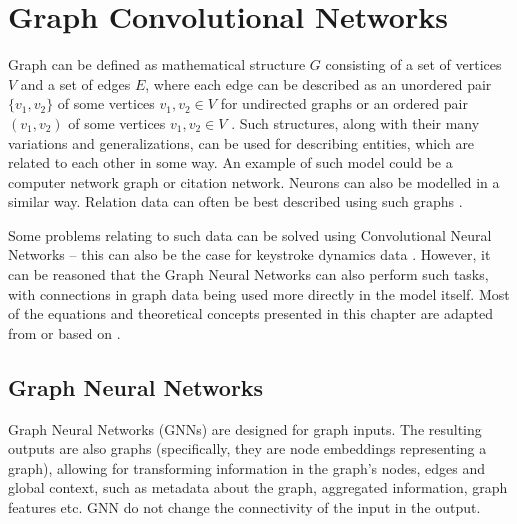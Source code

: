 
\chapter{Graph Convolutional Networks}

Graph can be defined as mathematical structure $G$ consisting of a set of vertices $V$ and a set of edges $E$, where each edge can be described as an unordered pair $\{ v_1, v_2 \}$ of some vertices $v_1, v_2 \in V$ for undirected graphs or an ordered pair $( v_1, v_2 )$ of some vertices $v_1, v_2 \in V$ \cite{wikipedia_graph_2025}. Such structures, along with their many variations and generalizations, can be used for describing entities, which are related to each other in some way. An example of such model could be a computer network graph or citation network. Neurons can also be modelled in a similar way. Relation data can often be best described using such graphs \cite{Lesk2024}.

Some problems relating to such data can be solved using Convolutional Neural Networks -- this can also be the case for keystroke dynamics data \cite{Lu2020}\cite{Shar2023}. However, it can be reasoned that the Graph Neural Networks can also perform such tasks, with connections in graph data being used more directly in the model itself. Most of the equations and theoretical concepts presented in this chapter are adapted from or based on \cite{Lesk2024}.

\section{Graph Neural Networks}
Graph Neural Networks (GNNs) are designed for graph inputs. The resulting outputs are also graphs (specifically, they are node embeddings representing a graph), allowing for transforming information in the graph's nodes, edges and global context, such as metadata about the graph, aggregated information, graph features etc. \cite{sanch2021} GNN do not change the connectivity of the input in the output. 

